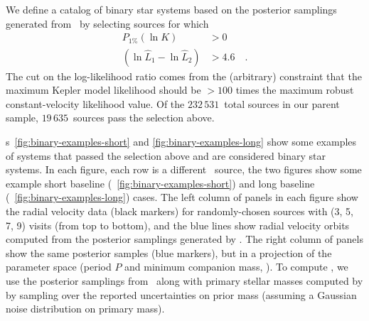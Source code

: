 \documentclass[modern]{aastex63}
\newcommand{\nsources}{\ensuremath{232\,531}}
\newcommand{\nbinary}{\ensuremath{19\,635}}
\begin{document}
We define a catalog of binary star systems based on the posterior samplings
generated from \thejoker\ by selecting sources for which
\begin{align}
    P_{1\%}(\ln K) &> 0\\
    (\ln \hat{L}_1 - \ln \hat{L}_2) &> 4.6 \quad . \label{eq:binary-cuts}
\end{align}
The cut on the log-likelihood ratio comes from the (arbitrary) constraint that
the maximum Kepler model likelihood should be $>100$ times the maximum robust
constant-velocity likelihood value.
Of the \nsources\ total sources in our parent sample, \nbinary\ sources pass the
selection above.

\figurename s~\ref{fig:binary-examples-short} and
\ref{fig:binary-examples-long} show some examples of systems that passed the
selection above and are considered binary star systems.
In each figure, each row is a different \apogee\ source, the two figures show
some example short baseline (\figurename~\ref{fig:binary-examples-short}) and
long baseline (\figurename~\ref{fig:binary-examples-long}) cases.
The left column of panels in each figure show the radial velocity data (black
markers) for randomly-chosen sources with (3, 5, 7, 9) visits (from top to
bottom), and the blue lines show radial velocity orbits computed from the
posterior samplings generated by \thejoker.
The right column of panels show the same posterior samples (blue markers), but
in a projection of the parameter space (period $P$ and minimum companion mass,
\mtwomin).
To compute \mtwomin, we use the posterior samplings from \thejoker\ along with
primary stellar masses computed by \citet{Queiroz:2019} by sampling over the
reported uncertainties on prior mass (assuming a Gaussian noise distribution on
primary mass).
\end{document}
